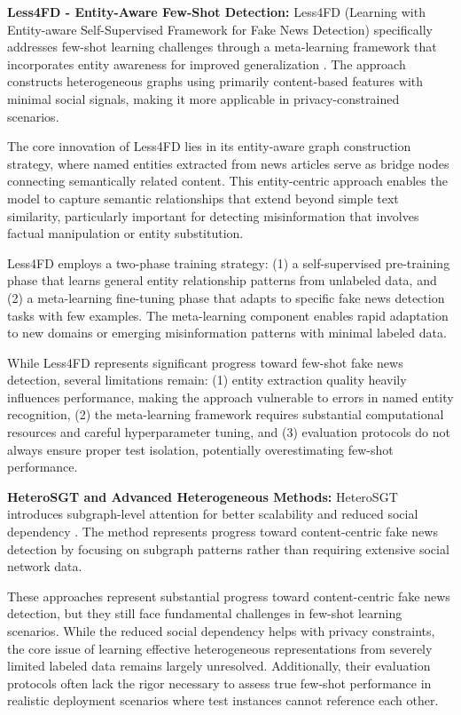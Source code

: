 \textbf{Less4FD - Entity-Aware Few-Shot Detection:} Less4FD (Learning with Entity-aware Self-Supervised Framework for Fake News Detection) specifically addresses few-shot learning challenges through a meta-learning framework that incorporates entity awareness for improved generalization \cite{zhang2023less4fd}. The approach constructs heterogeneous graphs using primarily content-based features with minimal social signals, making it more applicable in privacy-constrained scenarios.

The core innovation of Less4FD lies in its entity-aware graph construction strategy, where named entities extracted from news articles serve as bridge nodes connecting semantically related content. This entity-centric approach enables the model to capture semantic relationships that extend beyond simple text similarity, particularly important for detecting misinformation that involves factual manipulation or entity substitution.

Less4FD employs a two-phase training strategy: (1) a self-supervised pre-training phase that learns general entity relationship patterns from unlabeled data, and (2) a meta-learning fine-tuning phase that adapts to specific fake news detection tasks with few examples. The meta-learning component enables rapid adaptation to new domains or emerging misinformation patterns with minimal labeled data.

While Less4FD represents significant progress toward few-shot fake news detection, several limitations remain: (1) entity extraction quality heavily influences performance, making the approach vulnerable to errors in named entity recognition, (2) the meta-learning framework requires substantial computational resources and careful hyperparameter tuning, and (3) evaluation protocols do not always ensure proper test isolation, potentially overestimating few-shot performance.

\textbf{HeteroSGT and Advanced Heterogeneous Methods:} HeteroSGT introduces subgraph-level attention for better scalability and reduced social dependency \cite{wang2023heterosgt}. The method represents progress toward content-centric fake news detection by focusing on subgraph patterns rather than requiring extensive social network data.

These approaches represent substantial progress toward content-centric fake news detection, but they still face fundamental challenges in few-shot learning scenarios. While the reduced social dependency helps with privacy constraints, the core issue of learning effective heterogeneous representations from severely limited labeled data remains largely unresolved. Additionally, their evaluation protocols often lack the rigor necessary to assess true few-shot performance in realistic deployment scenarios where test instances cannot reference each other.

